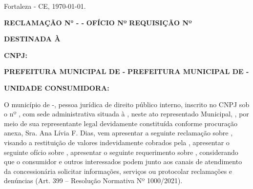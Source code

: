 \begin{flushright}
Fortaleza - CE, \today.
\end{flushright}

\ifnum{}
\textbf{RECLAMAÇÃO N° \numReclamacao{} - \nomeMunicipioMaisculo{} - \siglaEstado{}}
\else
\ifnum{}
\textbf{OFÍCIO Nº \numReclamacao{}}
\else
\textbf{REQUISIÇÃO Nº \numReclamacao{}}
\fi
\fi

\textbf{DESTINADA À \nomeConcessionaria{}}

\textbf{CNPJ: \cnpjConcessionaria{}}

\ifnum{}
\textbf{PREFEITURA MUNICIPAL DE \nomeMunicipioMaisculo{} - \siglaEstado{}}
\else
\textbf{PREFEITURA MUNICIPAL DE \nomeMunicipioMaisculo{} - \siglaEstado{}}
\fi

\ifnum{}
\textbf{UNIDADE CONSUMIDORA: \unidadeConsumidora{}}
\fi

\vspace{0.5cm}

O município de \nomeMunicipio{}-\siglaEstado{}, pessoa jurídica de direito público interno, inscrito no CNPJ sob o nº \cnpjMunicipio{}, com sede administrativa situada à \sedePrefeitura{}, neste ato representado \generoPrefeitura{} Municipal, \nomePrefeito{}, por meio de sua representante legal devidamente constituída conforme procuração anexa, Sra. Ana Lívia F. Dias, vem
\ifnum{}
apresentar a seguinte reclamação sobre \tituloDocumento{}, visando a restituição de valores indevidamente cobrados pela \nomeConcessionaria{}, 
\else
\ifnum{}
apresentar o seguinte ofício sobre \tituloDocumento{},
\else
apresentar o seguinte requerimento sobre \tituloDocumento{}, 
\fi
\fi
considerando que o consumidor e outros interessados podem junto aos canais de atendimento da concessionária solicitar informações, serviços ou protocolar reclamações e denúncias (Art. 399 -- Resolução Normativa Nº 1000/2021).
